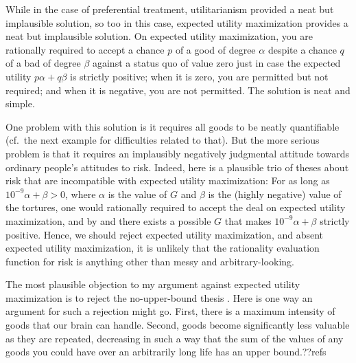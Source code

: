 While in the case of preferential treatment, utilitarianism provided a neat but implausible solution, so too in this case, expected utility
maximization provides a neat but implausible solution. On expected utility maximization, you are rationally required to
accept a chance $p$ of a good of degree $\alpha$ despite a chance $q$ of a bad of degree $\beta$ against a status quo of
value zero just in case the
expected utility $p\alpha + q\beta$ is strictly positive; when it is zero, you are permitted but not required; 
and when it is negative, you are not permitted. The solution is neat and simple. 

One problem with this solution is it requires all goods to be neatly
quantifiable (cf.\ the next example for difficulties related to that). But the more serious problem is that it requires an
implausibly negatively judgmental attitude towards ordinary people's attitudes to risk.
Indeed, here is a plausible trio of theses about risk that are incompatible with expected utility maximization:
For as long as $10^{-9}\alpha + \beta>0$, where $\alpha$ is the value of $G$ and $\beta$ is the (highly negative)
value of the tortures, one would rationally required to accept the deal on expected utility maximization, and by 
and  there exists a possible $G$ that makes $10^{-9}\alpha + \beta$ strictly positive.
Hence, we should reject expected utility maximization, and absent expected utility maximization, it is unlikely that the rationality 
evaluation function for risk is anything other than messy and arbitrary-looking.

The most plausible objection to my argument against expected utility maximization is to reject the no-upper-bound thesis .
Here is one way an argument for such a rejection might go. First, there is a maximum intensity of goods that our brain can handle.
Second, goods become significantly less valuable as they are repeated, decreasing in such a way that the sum of the values of any 
goods you could have over an arbitrarily long life has an upper bound.??refs

